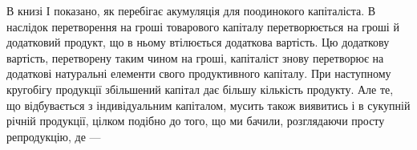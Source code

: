 
\label{original-380-2}
\noindent{}В книзі І показано, як перебігає акумуляція для поодинокого капіталіста. В наслідок перетворення на
гроші товарового капіталу перетворюється на гроші й додатковий продукт, що в ньому втілюється
додаткова вартість. Цю додаткову вартість, перетворену таким чином на гроші, капіталіст знову
перетворює на додаткові натуральні елементи свого продуктивного капіталу. При наступному кругобігу
продукції збільшений капітал дає більшу кількість продукту. Але те, що відбувається з індивідуальним
капіталом, мусить також виявитись і в сукупній річній продукції, цілком подібно до того, що ми
бачили, розглядаючи просту репродукцію, де —
\parbreak{}  %
